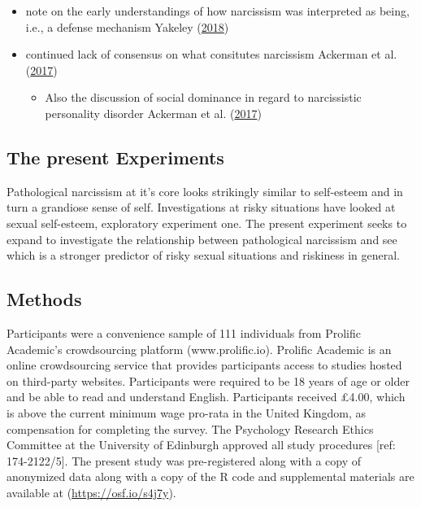 \documentclass[
  donotrepeattitle,doc, 12pt, a4paper,floatsintext]{apa7}
\providecommand{\tightlist}{%
  \setlength{\itemsep}{0pt}\setlength{\parskip}{0pt}}
\begin{document}
\begin{itemize}
\item
  note on the early understandings of how narcissism was interpreted as being, i.e., a defense mechanism Yakeley (\protect\hyperlink{ref-yakeley2018}{2018})
\item
  continued lack of consensus on what consitutes narcissism Ackerman et al. (\protect\hyperlink{ref-ackerman2017}{2017})

  \begin{itemize}
  \tightlist
  \item
    Also the discussion of social dominance in regard to narcissistic personality disorder Ackerman et al. (\protect\hyperlink{ref-ackerman2017}{2017})
  \end{itemize}
\end{itemize}

\hypertarget{the-present-experiments}{%
\subsection{The present Experiments}\label{the-present-experiments}}

Pathological narcissism at it's core looks strikingly similar to self-esteem and in turn a grandiose sense of self. Investigations at risky situations have looked at sexual self-esteem, exploratory experiment one. The present experiment seeks to expand to investigate the relationship between pathological narcissism and see which is a stronger predictor of risky sexual situations and riskiness in general.

\hypertarget{methods-3}{%
\subsection{Methods}\label{methods-3}}

Participants were a convenience sample of 111 individuals from Prolific Academic's crowdsourcing platform (www.prolific.io). Prolific Academic is an online crowdsourcing service that provides participants access to studies hosted on third-party websites. Participants were required to be 18 years of age or older and be able to read and understand English. Participants received £4.00, which is above the current minimum wage pro-rata in the United Kingdom, as compensation for completing the survey. The Psychology Research Ethics Committee at the University of Edinburgh approved all study procedures {[}ref: 174-2122/5{]}. The present study was pre-registered along with a copy of anonymized data along with a copy of the R code and supplemental materials are available at (\url{https://osf.io/s4j7y}).
\end{document}
